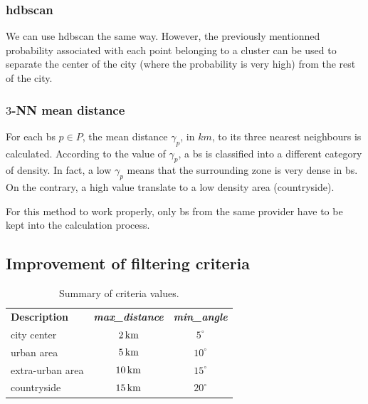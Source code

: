 \documentclass[lettersize,journal,english]{IEEEtran}
\begin{document}
        \subsubsection{\acrshort{hdbscan}}
            We can use \acrshort{hdbscan} the same way. However, the previously mentionned probability associated with each point belonging to a cluster can be used to separate the center of the city (where the probability is very high) from the rest of the city.

        \subsubsection{$3$-NN mean distance}
            For each \acrshort{bs} $p\in P$, the mean distance $\gamma_p$, in $\unit{km}$, to its three nearest neighbours is calculated. According to the value of $\gamma_p$, a \acrshort{bs} is classified into a different category of density. In fact, a low $\gamma_p$ means that the surrounding zone is very dense in \acrshort{bs}. On the contrary, a high value translate to a low density area (countryside).

            For this method to work properly, only \acrshort{bs} from the same provider have to be kept into the calculation process.


    \subsection{Improvement of filtering criteria}
        \begin{table}
            \centering
            \caption{Summary of criteria values.}
            \label{table:crit_summary}
            \begin{tabular}{lcc}
                \toprule
                \textbf{Description} & \textbf{\emph{max\_distance}} & \textbf{\emph{min\_angle}} \\
                \cmidrule(lr){1-3}
                city center & $\unit[2]{km}$ & $5^\circ$ \\
                urban area & $\unit[5]{km}$ & $10^\circ$ \\
                extra-urban area & $\unit[10]{km}$ & $15^\circ$ \\
                countryside & $\unit[15]{km}$ & $20^\circ$ \\
                \bottomrule
            \end{tabular}
        \end{table}
\end{document}
